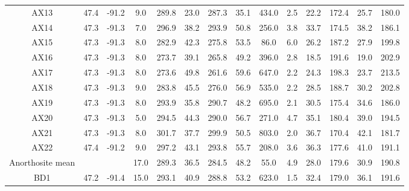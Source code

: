\documentclass[draft]{agujournal2019}
\begin{document}
\begin{table}
\begin{tabular}{cccccccccccccc}
AX13             & 47.4 & -91.2 & 9.0  & 289.8   & 23.0         & 287.3   & 35.1    & 434.0 & 2.5                     & 22.2        & 172.4       & 25.7         & 180.0        \\
AX14             & 47.3 & -91.3 & 7.0  & 296.9   & 38.2         & 293.9   & 50.8    & 256.0 & 3.8                     & 33.7        & 174.5       & 38.2         & 186.1        \\
AX15             & 47.3 & -91.3 & 8.0  & 282.9   & 42.3         & 275.8   & 53.5    & 86.0  & 6.0                     & 26.2        & 187.2       & 27.9         & 199.8        \\
AX16             & 47.3 & -91.3 & 8.0  & 273.7   & 39.1         & 265.8   & 49.2    & 396.0 & 2.8                     & 18.5        & 191.6       & 19.0         & 202.9        \\
AX17             & 47.3 & -91.3 & 8.0  & 273.6   & 49.8         & 261.6   & 59.6    & 647.0 & 2.2                     & 24.3        & 198.3       & 23.7         & 213.5        \\
AX18             & 47.3 & -91.3 & 9.0  & 283.8   & 45.5         & 276.0   & 56.9    & 535.0 & 2.2                     & 28.5        & 188.7       & 30.2         & 202.8        \\
AX19             & 47.3 & -91.3 & 8.0  & 293.9   & 35.8         & 290.7   & 48.2    & 695.0 & 2.1                     & 30.5        & 175.4       & 34.6         & 186.0        \\
AX20             & 47.3 & -91.3 & 5.0  & 294.5   & 44.3         & 290.0   & 56.7    & 271.0 & 4.7                     & 35.1        & 180.4       & 39.0         & 194.5        \\
AX21             & 47.3 & -91.3 & 8.0  & 301.7   & 37.7         & 299.9   & 50.5    & 803.0 & 2.0                     & 36.7        & 170.4       & 42.1         & 181.7        \\
AX22             & 47.4 & -91.2 & 9.0  & 297.2   & 43.1         & 293.8   & 55.7    & 208.0 & 3.6                     & 36.3        & 177.6       & 41.0         & 191.1        \\
\hline
Anorthosite mean &      &       & 17.0 & 289.3   & 36.5         & 284.5   & 48.2    & 55.0  & 4.9                     & 28.0        & 179.6       & 30.9         & 190.8        \\
\hline
BD1              & 47.2 & -91.4 & 15.0 & 293.1   & 40.9         & 288.8   & 53.2    & 623.0 & 1.5                     & 32.4        & 179.0       & 36.1         & 191.6        \\

\end{tabular}
\end{table}
\end{document}
